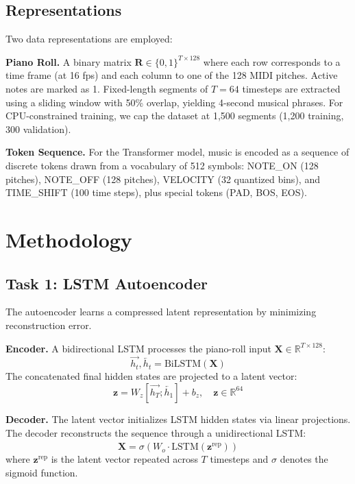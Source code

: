\documentclass[conference]{IEEEtran}
\begin{document}
\subsection{Representations}
Two data representations are employed:

\textbf{Piano Roll.} A binary matrix $\mathbf{R} \in \{0,1\}^{T \times 128}$ where each row corresponds to a time frame (at 16 fps) and each column to one of the 128 MIDI pitches. Active notes are marked as 1. Fixed-length segments of $T = 64$ timesteps are extracted using a sliding window with 50\% overlap, yielding 4-second musical phrases. For CPU-constrained training, we cap the dataset at 1,500 segments (1,200 training, 300 validation).

\textbf{Token Sequence.} For the Transformer model, music is encoded as a sequence of discrete tokens drawn from a vocabulary of 512 symbols: NOTE\_ON (128 pitches), NOTE\_OFF (128 pitches), VELOCITY (32 quantized bins), and TIME\_SHIFT (100 time steps), plus special tokens (PAD, BOS, EOS).

\section{Methodology}

\subsection{Task 1: LSTM Autoencoder}

The autoencoder learns a compressed latent representation by minimizing reconstruction error.

\textbf{Encoder.} A bidirectional LSTM processes the piano-roll input $\mathbf{X} \in \mathbb{R}^{T \times 128}$:
\begin{equation}
    \overrightarrow{h_t}, \overleftarrow{h_t} = \text{BiLSTM}(\mathbf{X})
\end{equation}
The concatenated final hidden states are projected to a latent vector:
\begin{equation}
    \mathbf{z} = W_z [\overrightarrow{h_T}; \overleftarrow{h_1}] + b_z, \quad \mathbf{z} \in \mathbb{R}^{64}
\end{equation}

\textbf{Decoder.} The latent vector initializes LSTM hidden states via linear projections. The decoder reconstructs the sequence through a unidirectional LSTM:
\begin{equation}
    \hat{\mathbf{X}} = \sigma(W_o \cdot \text{LSTM}(\mathbf{z}^{\text{rep}}))
\end{equation}
where $\mathbf{z}^{\text{rep}}$ is the latent vector repeated across $T$ timesteps and $\sigma$ denotes the sigmoid function.
\end{document}
